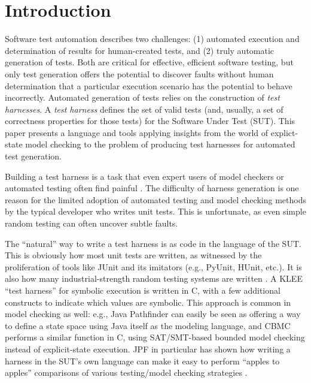 \section{Introduction}

Software test automation describes two challenges: (1) automated
execution and determination of results for human-created tests, and
(2) truly automatic generation of tests.  Both are critical for effective,
efficient software testing, but only test generation offers the
potential to discover faults without human determination that a
particular execution scenario has the potential to behave incorrectly.
Automated generation of tests relies on the construction of \emph{test
  harnesses}.  A \emph{test harness} defines the set of valid tests
(and, usually, a set of correctness properties for those tests) for
the Software Under Test (SUT).  This paper presents a language and
tools applying insights from the world of explict-state model
checking to the problem of producing test harnesses for automated
test generation.

Building a test harness is a task that even expert users of model
checkers or automated testing often find painful
\cite{woda08,woda12}.  The difficulty of harness generation is one
reason for the limited adoption of automated testing and model
checking methods by the typical developer who writes unit tests.  This is
unfortunate, as even simple random testing can often uncover subtle
faults.

The ``natural'' way to write a test harness is as code in the language
of the SUT.  This is obviously how most unit
tests are written, as witnessed by the proliferation of tools like
JUnit \cite{JUnit} and its imitators (e.g., PyUnit, HUnit, etc.).  It
is also how many industrial-strength random testing systems are
written \cite{ICSEDiff,AMAI}.  A KLEE ``test harness'' \cite{KLEE} for
symbolic execution is written in C, with a few additional constructs
to indicate which values are symbolic.  This approach is common in
model checking as well: e.g., Java Pathfinder \cite{JPF,JPF2} can
easily be seen as offering a way to define a state space using Java
itself as the modeling language, and CBMC \cite{CBMC,CBMCp} performs a
similar function in C, using SAT/SMT-based bounded model checking
instead of explicit-state execution.  JPF in particular has shown how
writing a harness in the SUT's own language can make it easy to
perform ``apples to apples'' comparisons of various testing/model
checking strategies \cite{JPFRandTest}.


